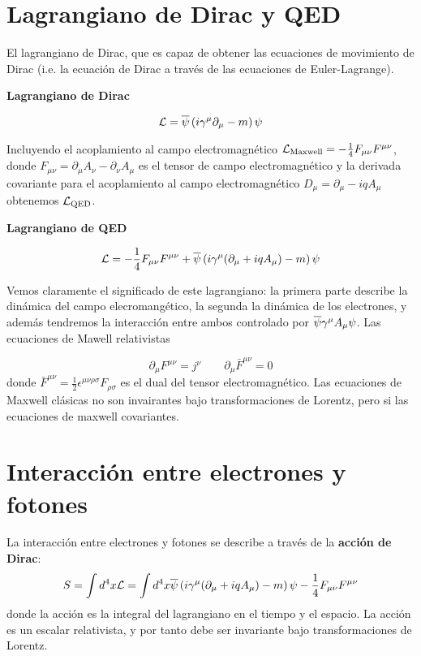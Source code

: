 \section{Lagrangiano de Dirac y QED}

El lagrangiano de Dirac, que es capaz de obtener las ecuaciones de movimiento de Dirac (i.e. la ecuación de Dirac a través de las ecuaciones de Euler-Lagrange).

\begin{Resaltar}
    \begin{center}
        \textbf{Lagrangiano de Dirac}
    \end{center}
    \begin{equation}
        \mathcal{L} = \overline{\psi} \left( i \gamma^\mu \partial_\mu - m \right) \psi
    \end{equation}
\end{Resaltar}
Incluyendo el acoplamiento al campo electromagnético $\mathcal{L}_{\text{Maxwell}}=-\frac{1}{4} F_{\mu\nu} F^{\mu\nu}$, donde $F_{\mu\nu} = \partial_\mu A_\nu - \partial_\nu A_\mu$ es el tensor de campo electromagnético y la derivada covariante para el acoplamiento al campo electromagnético $D_\mu = \partial_\mu - i q A_\mu$ obtenemos $\mathcal{L}_{\text{QED}}$. 
\begin{Resaltar}
    \begin{center}
        \textbf{Lagrangiano de QED}
    \end{center}
    \begin{equation}
        \mathcal{L} = - \frac{1}{4} F_{\mu \nu} F^{\mu \nu} + \overline{\psi} \left( i \gamma^\mu (\partial_\mu + i q A_\mu) - m \right) \psi
    \end{equation}
\end{Resaltar}
Vemos claramente el significado de este lagrangiano: la primera parte describe la dinámica del campo elecromangético, la segunda la dinámica de los electrones, y además tendremos la interacción entre ambos controlado por $\overline{\psi} \gamma^\mu A_\mu \psi$. Las ecuaciones de Mawell relativistas 

\begin{equation}
    \partial_\mu F^{\mu\nu}  = j^\nu  \qquad \partial_\mu \bar{F}^{\mu\nu} = 0
\end{equation}
donde $\bar{F}^{\mu\nu} = \frac{1}{2} \epsilon^{\mu\nu\rho\sigma} F_{\rho\sigma}$ es el dual del tensor electromagnético. Las ecuaciones de Maxwell clásicas no son invairantes bajo transformaciones de Lorentz, pero si las ecuaciones de maxwell covariantes. 

\section{Interacción entre electrones y fotones}
La interacción entre electrones y fotones se describe a través de la \textbf{acción de Dirac}:
\begin{equation}
    S = \int d^4 x \mathcal{L} = \int d^4 x \overline{\psi} \left( i \gamma^\mu (\partial_\mu + i q A_\mu) - m \right) \psi - \frac{1}{4} F_{\mu\nu} F^{\mu\nu}
\end{equation}
donde la acción es la integral del lagrangiano en el tiempo y el espacio. La acción es un escalar relativista, y por tanto debe ser invariante bajo transformaciones de Lorentz. 